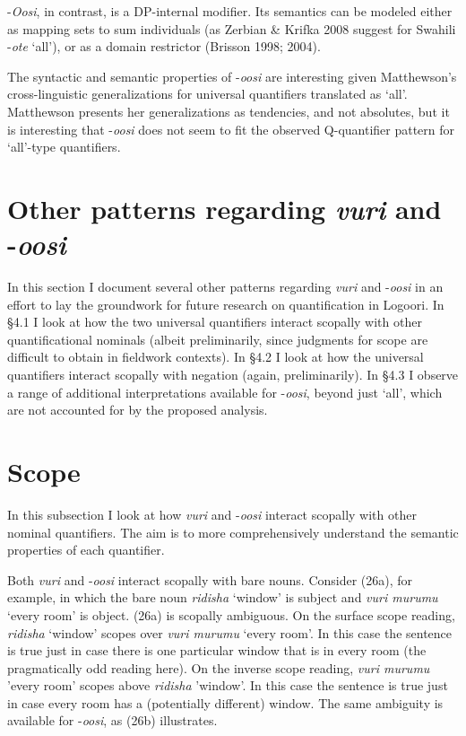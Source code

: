 \documentclass[output=paper]{langsci/langscibook}
\begin{document}
  {}-\textit{Oosi}, in contrast, is a DP-internal modifier. Its semantics can be modeled either as mapping sets to sum individuals (as Zerbian \& Krifka 2008 suggest for Swahili -\textit{ote }‘all’), or as a domain restrictor (Brisson 1998; 2004). 

  The syntactic and semantic properties of -\textit{oosi} are interesting given Matthewson's cross-linguistic generalizations for universal quantifiers translated as ‘all’. Matthewson presents her generalizations as tendencies, and not absolutes, but it is interesting that -\textit{oosi} does not seem to fit the observed Q-quantifier pattern for ‘all’-type quantifiers. 

\section{ Other patterns regarding \textit{vuri }and -\textit{oosi}}

  In this section I document several other patterns regarding \textit{vuri} and -\textit{oosi} in an effort to lay the groundwork for future research on quantification in Logoori. In §4.1 I look at how the two universal quantifiers interact scopally with other quantificational nominals (albeit preliminarily, since judgments for scope are difficult to obtain in fieldwork contexts). In §4.2 I look at how the universal quantifiers interact scopally with negation (again, preliminarily). In §4.3 I observe a range of additional interpretations available for -\textit{oosi}, beyond just ‘all’, which are not accounted for by the proposed analysis.

\section{Scope }

  In this subsection I look at how \textit{vuri} and -\textit{oosi} interact scopally with other nominal quantifiers. The aim is to more comprehensively understand the semantic properties of each quantifier.

  Both \textit{vuri }and -\textit{oosi} interact scopally with bare nouns. Consider (26a), for example, in which the bare noun \textit{ridisha }‘window’ is subject and \textit{vuri murumu }‘every room’ is object. (26a) is scopally ambiguous. On the surface scope reading, \textit{ridisha} ‘window’ scopes over \textit{vuri murumu }‘every room’. In this case the sentence is true just in case there is one particular window that is in every room (the pragmatically odd reading here). On the inverse scope reading, \textit{vuri murumu }'every room' scopes above \textit{ridisha} 'window'. In this case the sentence is true just in case every room has a (potentially different) window. The same ambiguity is available for -\textit{oosi}, as (26b) illustrates.
\end{document}
